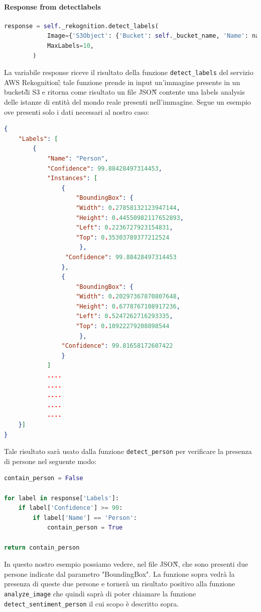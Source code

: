 \paragraph{Response from detect\textunderscore{}labels} \aCapo{}
\begin{lstlisting}[language=Python]
response = self._rekognition.detect_labels(
            Image={'S3Object': {'Bucket': self._bucket_name, 'Name': name_image}},
            MaxLabels=10,
        )
\end{lstlisting}
La variabile response riceve il risultato della funzione \verb+detect_labels+ del servizio AWS Rekognition\G; tale funzione prende in input un'immagine presente in un bucket\G di S3 e ritorna come risultato un file JSON\G{} contente una labels analysis delle istanze di entità del mondo reale presenti nell'immagine. Segue un esempio ove presenti solo i dati necessari al nostro caso:
\begin{lstlisting}[language=JSON]
{
	"Labels": [
		{
			"Name": "Person",
            "Confidence": 99.88428497314453,
            "Instances": [
            	{
                	"BoundingBox": {
                    "Width": 0.27858132123947144,
                    "Height": 0.44550982117652893,
                    "Left": 0.2236727923154831,
                    "Top": 0.35303789377212524
                     },
                 "Confidence": 99.88428497314453
                },
				{
                    "BoundingBox": {
                    "Width": 0.20297367870807648,
                    "Height": 0.6778767108917236,
                    "Left": 0.5247262716293335,
                    "Top": 0.10922279208898544
                  	 },
                "Confidence": 99.81658172607422
				}
			]
            ....
            ....
            ....
            ....
        	....
	}]
}
\end{lstlisting}
Tale risultato sarà usato dalla funzione \verb+detect_person+ per verificare la presenza di persone nel seguente modo:
\begin{lstlisting}[language=Python]
contain_person = False

for label in response['Labels']:
    if label['Confidence'] >= 90:
        if label['Name'] == 'Person':
            contain_person = True

return contain_person
\end{lstlisting}
In questo nostro esempio possiamo vedere, nel file JSON\G{}, che sono presenti due persone indicate dal parametro "BoundingBox". La funzione sopra vedrà la presenza di queste due persone e tornerà un risultato positivo alla funzione \verb+analyze_image+ che quindi saprà di poter chiamare la funzione \verb+detect_sentiment_person+ il cui scopo è descritto sopra.
